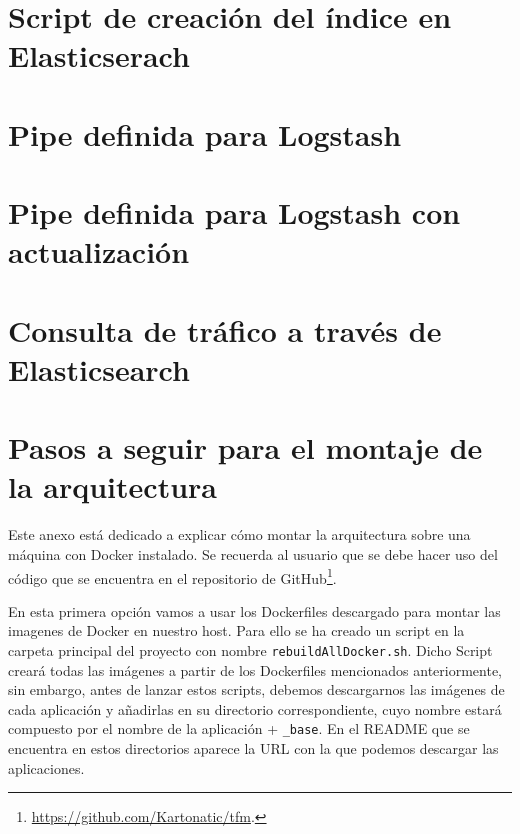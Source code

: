\newpage
\chapter{Script de creación del índice en Elasticserach}\label{apendG}


\newpage
\chapter{Pipe definida para Logstash}\label{apendH}



\newpage

\chapter{Pipe definida para Logstash con actualización\label{apendI}}



\newpage
\chapter{Consulta de tráfico a través de Elasticsearch\label{apendJ}}




\newpage
\chapter{Pasos a seguir para el montaje de la arquitectura\label{apendK}}

Este anexo está dedicado a explicar cómo montar la arquitectura sobre una
máquina con Docker instalado. Se recuerda al usuario que se debe hacer
uso del código que se encuentra en el repositorio de
GitHub\footnote{\url{https://github.com/Kartonatic/tfm}.}.

En esta primera opción vamos a usar los Dockerfiles descargado 
para montar las imagenes de Docker en nuestro host. Para ello se
ha creado un script en la carpeta principal del proyecto
con nombre {\tt rebuildAllDocker.sh}. Dicho Script creará todas las
imágenes a partir de los Dockerfiles mencionados anteriormente, sin
embargo, antes de lanzar estos scripts, debemos descargarnos las imágenes
de cada aplicación y añadirlas en su directorio correspondiente, cuyo
nombre estará compuesto por el nombre de la aplicación + {\tt \_base}. En
el README que se encuentra en estos directorios aparece la URL con la que
podemos descargar las aplicaciones.

